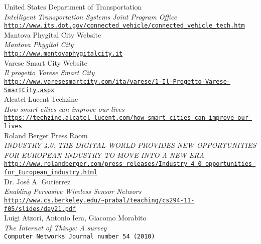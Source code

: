 \begin{thebibliography}{}
 United States Department of Transportation\\
  \emph{Intelligent Transportation Systems Joint Program Office} \\
  \footnotesize \texttt{\url{http://www.its.dot.gov/connected_vehicle/connected_vehicle_tech.htm}} \\
  
 Mantova Phygital City Website\\
  \emph{Mantova Phygital City} \\
  \footnotesize \texttt{\url{http://www.mantovaphygitalcity.it}} \\
  
 Varese Smart City Website\\
  \emph{Il progetto Varese Smart City} \\
  \footnotesize \texttt{\url{http://www.varesesmartcity.com/ita/varese/1-Il-Progetto-Varese-SmartCity.aspx}} \\
  
 Alcatel-Lucent Techzine\\
  \emph{How smart cities can improve our lives} \\
  \footnotesize \texttt{\url{https://techzine.alcatel-lucent.com/how-smart-cities-can-improve-our-lives}} \\
  
 Roland Berger Press Room\\
  \emph{INDUSTRY 4.0: THE DIGITAL WORLD PROVIDES NEW OPPORTUNITIES FOR EUROPEAN INDUSTRY TO MOVE INTO A NEW ERA
} \\
  \footnotesize \texttt{\url{http://www.rolandberger.com/press_releases/Industry_4_0_opportunities_for_European_industry.html}} \\
  
 Dr. José A. Gutierrez\\
  \emph{Enabling Pervasive Wireless Sensor Networs} \\
  \footnotesize \texttt{\url{http://www.cs.berkeley.edu/~prabal/teaching/cs294-11-f05/slides/day21.pdf}} \\
  
 Luigi Atzori, Antonio Iera, Giacomo Morabito\\
  \emph{The Internet of Things: A survey} \\
  \footnotesize \texttt{Computer Networks Journal number 54 (2010)} \\
  

\end{thebibliography}
